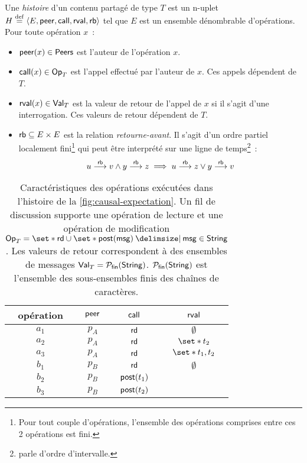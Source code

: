\begin{definition}\label{def:history}
Une \emph{histoire} d'un contenu partagé de type $T$ est un n-uplet $H \defeq \tuple*{E, \trm{peer}, \trm{call}, \trm{rval}, \trm{rb}}$ tel que $E$ est un ensemble dénombrable d'opérations.
Pour toute opération $x$~:
\begin{itemize}
\item $\trm{peer}(x) \in \trm{Peers}$ est l'auteur de l'opération $x$.
\item $\trm{call}(x) \in \trm{Op}_T$ est l'appel effectué par l'auteur de $x$.
Ces appels dépendent de $T$.
\item $\trm{rval}(x) \in \trm{Val}_T$ est la valeur de retour de l'appel de $x$ si il s'agit d'une interrogation.
Ces valeurs de retour dépendent de $T$.
\end{itemize}
\begin{itemize}[leftmargin=*]
\item[] $\trm{rb} \subseteq E \times E$ est la relation \emph{retourne-avant}.
Il s'agit d'un ordre partiel localement fini\footnote{Pour tout couple d'opérations, l'ensemble des opérations comprises entre ces 2 opérations est fini.} qui peut être interprété sur une ligne de temps\footnote{\textcite{greenough_1976_semiorder} parle d'ordre d'intervalle.}~:
\begin{equation*}
    u \rb v \land y \rb z \implies u \rb z \lor y \rb v
\end{equation*}
\end{itemize}
\end{definition}

\begin{table}[ht]
    \centering
    \begin{tabular}{cccc}
        opération & $\trm{peer}$ & $\trm{call}$ & $\trm{rval}$ \\
        \toprule
        $a_1$ & $p_A$ & $\trm{rd}$ & $\emptyset$ \\
        $a_2$ & $p_A$ & $\trm{rd}$ & $\set*{t_2}$ \\
        $a_3$ & $p_A$ & $\trm{rd}$ & $\set*{t_1, t_2}$ \\
        $b_1$ & $p_B$ & $\trm{rd}$ & $\emptyset$ \\
        $b_2$ & $p_B$ & $\trm{post}(t_1)$ & \\
        $b_3$ & $p_B$ & $\trm{post}(t_2)$ & \\
    \end{tabular}
    \caption[Caractéristiques des opérations exécutées dans l'histoire de la \autoref{fig:causal-expectation}]{Caractéristiques des opérations exécutées dans l'histoire de la \autoref{fig:causal-expectation}.
    Un fil de discussion supporte une opération de lecture et une opération de modification $\trm{Op}_T = \set*{\trm{rd}} \cup \set*{\trm{post}(\trm{msg}) \given \trm{msg} \in \trm{String}}$.
    Les valeurs de retour correspondent à des ensembles de messages $\trm{Val}_T = \powerfset{\trm{String}}$. $\powerfset{\trm{String}}$ est l'ensemble des sous-ensembles finis des chaînes de caractères.}\label{tab:op-attributes}
\end{table}

